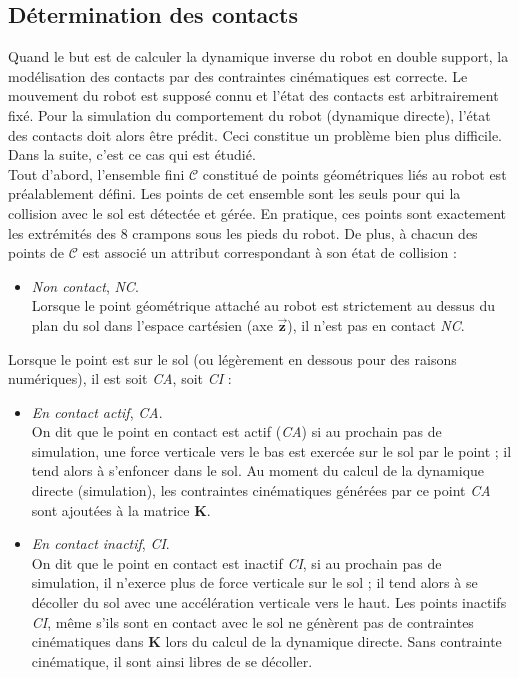 \subsection{Détermination des contacts}

Quand le but est de calculer la dynamique inverse du robot en double
support, la modélisation des contacts par des contraintes cinématiques
est correcte. 
Le mouvement du robot est supposé connu et l'état des contacts 
est arbitrairement fixé.
Pour la simulation du comportement du robot (dynamique directe), 
l'état des contacts doit alors être prédit.
Ceci constitue un problème bien plus difficile.
Dans la suite, c'est ce cas qui est étudié.\\

Tout d'abord, l'ensemble fini $\mathscr{C}$ constitué de points géométriques 
liés au robot est préalablement défini.
Les points de cet ensemble sont les seuls pour qui la collision 
avec le sol est détectée et gérée.
En pratique, ces points sont exactement les extrémités des $8$ crampons
sous les pieds du robot.
De plus, à chacun des points de $\mathscr{C}$ est associé un attribut 
correspondant à son état de collision :
\begin{itemize}
    \item \textit{Non contact}, \textit{NC}.\\
    Lorsque le point géométrique attaché au robot est strictement au dessus du plan du sol
    dans l'espace cartésien (axe $\bm{\vec{z}}$), il n'est pas en contact \textit{NC}.
\end{itemize}
Lorsque le point est sur le sol (ou légèrement en dessous pour des raisons
numériques), il est soit \textit{CA}, soit \textit{CI} :
\begin{itemize}
    \item \textit{En contact actif}, \textit{CA}.\\
        On dit que le point en contact est actif (\textit{CA}) si au prochain pas de simulation,
    une force verticale vers le bas est exercée sur le sol par le point ; 
    il tend alors à s'enfoncer dans le sol.
    Au moment du calcul de la dynamique directe (simulation), les contraintes 
    cinématiques générées par ce point \textit{CA} sont ajoutées à la matrice $\bm{K}$.
    \item \textit{En contact inactif}, \textit{CI}.\\
    On dit que le point en contact est inactif \textit{CI}, si au prochain pas de simulation,
    il n'exerce plus de force verticale sur le sol ; il tend alors à se décoller du sol 
    avec une accélération verticale vers le haut.
    Les points inactifs \textit{CI}, même s'ils sont en contact avec le sol
    ne génèrent pas de contraintes cinématiques dans $\bm{K}$ lors du calcul 
    de la dynamique directe.
    Sans contrainte cinématique, il sont ainsi libres de se décoller.
\end{itemize}

